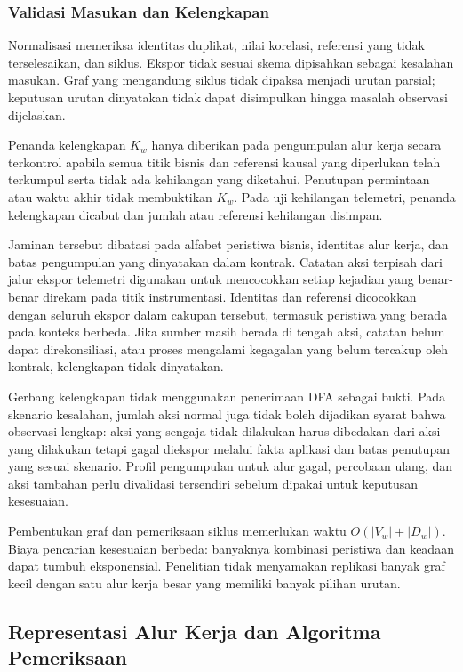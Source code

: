 \subsubsection{Validasi Masukan dan Kelengkapan}
\label{sec:completeness}
Normalisasi memeriksa identitas duplikat, nilai korelasi, referensi yang tidak terselesaikan, dan siklus. Ekspor tidak sesuai skema dipisahkan sebagai kesalahan masukan. Graf yang mengandung siklus tidak dipaksa menjadi urutan parsial; keputusan urutan dinyatakan tidak dapat disimpulkan hingga masalah observasi dijelaskan.

Penanda kelengkapan $K_w$ hanya diberikan pada pengumpulan alur kerja secara terkontrol apabila semua titik bisnis dan referensi kausal yang diperlukan telah terkumpul serta tidak ada kehilangan yang diketahui. Penutupan permintaan atau waktu akhir  tidak membuktikan $K_w$. Pada uji kehilangan telemetri, penanda kelengkapan dicabut dan jumlah atau referensi kehilangan disimpan.

Jaminan tersebut dibatasi pada alfabet peristiwa bisnis, identitas alur kerja, dan batas pengumpulan yang dinyatakan dalam kontrak. Catatan aksi terpisah dari jalur ekspor telemetri digunakan untuk mencocokkan setiap kejadian yang benar-benar direkam pada titik instrumentasi. Identitas dan referensi dicocokkan dengan seluruh ekspor dalam cakupan tersebut, termasuk peristiwa yang berada pada konteks  berbeda. Jika sumber masih berada di tengah aksi, catatan belum dapat direkonsiliasi, atau proses mengalami kegagalan yang belum tercakup oleh kontrak, kelengkapan tidak dinyatakan.

Gerbang kelengkapan tidak menggunakan penerimaan DFA sebagai bukti. Pada skenario kesalahan, jumlah aksi normal juga tidak boleh dijadikan syarat bahwa observasi lengkap: aksi yang sengaja tidak dilakukan harus dibedakan dari aksi yang dilakukan tetapi gagal diekspor melalui fakta aplikasi dan batas penutupan yang sesuai skenario. Profil pengumpulan untuk alur gagal, percobaan ulang, dan aksi tambahan perlu divalidasi tersendiri sebelum dipakai untuk keputusan kesesuaian.

Pembentukan graf dan pemeriksaan siklus memerlukan waktu $O(|V_w|+|D_w|)$. Biaya pencarian kesesuaian berbeda: banyaknya kombinasi peristiwa dan keadaan dapat tumbuh eksponensial. Penelitian tidak menyamakan replikasi banyak graf kecil dengan satu alur kerja besar yang memiliki banyak pilihan urutan.

\subsection{Representasi Alur Kerja dan Algoritma Pemeriksaan}
